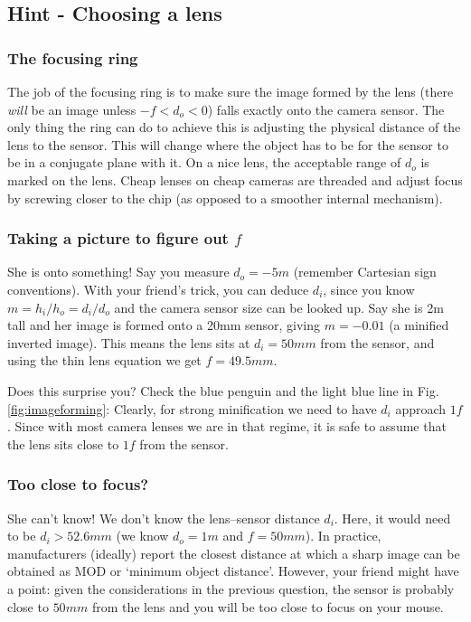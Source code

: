 \documentclass[a4paper]{report}
\begin{document}
	\clearpage
	
	
    \subsection{Hint - Choosing a lens}
	\hypertarget{hintTo-buying}{}
	
	\subsubsection{The focusing ring}
	The job of the focusing ring is to make sure the image formed by the lens (there \emph{will} be an image unless $-f<d_o<0$) falls exactly onto the camera sensor. The only thing the ring can do to achieve this is adjusting the physical distance of the lens to the sensor. This will change where the object has to be for the sensor to be in a conjugate plane with it. On a nice lens, the acceptable range of $d_o$ is marked on the lens. Cheap lenses on cheap cameras are threaded and adjust focus by screwing closer to the chip (as opposed to a smoother internal mechanism).

	
	\subsubsection{Taking a picture to figure out $f$}
	She is onto something! Say you measure $d_o=-5m$ (remember Cartesian sign conventions). With your friend's trick, you can deduce $d_i$, since you know $m=h_i/h_o=d_i/d_o$ and the camera sensor size can be looked up. Say she is 2m tall and her image is formed onto a 20mm sensor, giving $m=-0.01$ (a minified inverted image). This means the lens sits at $d_i=50mm$ from the sensor, and using the thin lens equation we get $f=49.5mm$. 
	
	Does this surprise you? Check the blue penguin and the light blue line in Fig. \ref{fig:imageforming}: Clearly, for strong minification we need to have $d_i$ approach $1f$. Since with most camera lenses we are in that regime, it is safe to assume that the lens sits close to $1f$ from the sensor.
	
	\subsubsection{Too close to focus?}
	She can't know! We don't know the lens--sensor distance $d_i$. Here, it would need to be $d_i>52.6mm$ (we know $d_o=1m$ and $f=50mm$). In practice, manufacturers (ideally) report the closest distance at which a sharp image can be obtained as MOD or `minimum object distance'. However, your friend might have a point: given the considerations in the previous question, the sensor is probably close to $50mm$ from the lens and you will be too close to focus on your mouse.
\end{document}
